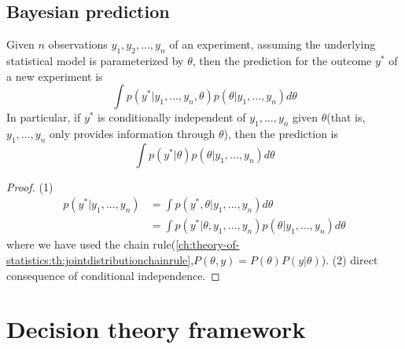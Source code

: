 \begin{refsection}
\subsection{Bayesian prediction}
\begin{lemma}
	Given $n$ observations $y_1,y_2,...,y_n$ of an experiment, assuming the underlying statistical model is parameterized by $\theta$, then the prediction for the outcome $y^*$ of a new experiment is
	$$\int p(y^*|y_1,...,y_n,\theta)p(\theta|y_1,...,y_n)d\theta$$
	In particular, if $y^*$ is conditionally independent of $y_1,...,y_n$ given $\theta$(that is, $y_1,...,y_n$ only provides information through $\theta$), then the prediction is
	$$\int p(y^*|\theta)p(\theta|y_1,...,y_n)d\theta$$	
\end{lemma}
\begin{proof}
	(1)
	\begin{align*}
	p(y^*|y_1,...,y_n) &= \int p(y^*,\theta|y_1,...,y_n) d\theta \\
	&=\int p(y^*|\theta, y_1,...,y_n)p(\theta|y_1,...,y_n) d\theta 
	\end{align*}
	where we have used the chain rule(\autoref{ch:theory-of-statistics:th:jointdistributionchainrule},$P(\theta,y)=P(\theta)P(y|\theta)$).
	(2) direct consequence of conditional independence.
\end{proof}




\section{Decision theory framework}

\end{refsection}
